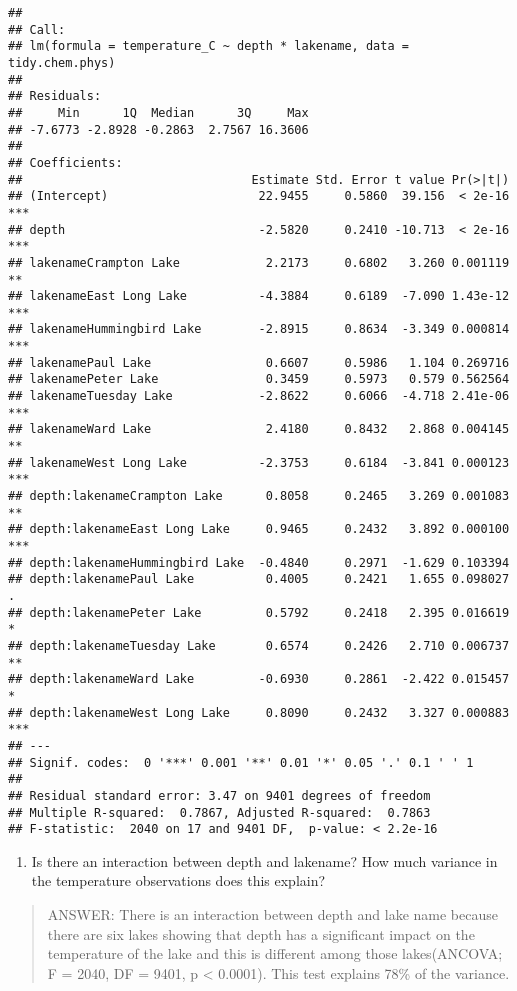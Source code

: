 \documentclass[]{article}
\providecommand{\tightlist}{%
  \setlength{\itemsep}{0pt}\setlength{\parskip}{0pt}}
\begin{document}
\begin{verbatim}
## 
## Call:
## lm(formula = temperature_C ~ depth * lakename, data = tidy.chem.phys)
## 
## Residuals:
##     Min      1Q  Median      3Q     Max 
## -7.6773 -2.8928 -0.2863  2.7567 16.3606 
## 
## Coefficients:
##                                Estimate Std. Error t value Pr(>|t|)    
## (Intercept)                     22.9455     0.5860  39.156  < 2e-16 ***
## depth                           -2.5820     0.2410 -10.713  < 2e-16 ***
## lakenameCrampton Lake            2.2173     0.6802   3.260 0.001119 ** 
## lakenameEast Long Lake          -4.3884     0.6189  -7.090 1.43e-12 ***
## lakenameHummingbird Lake        -2.8915     0.8634  -3.349 0.000814 ***
## lakenamePaul Lake                0.6607     0.5986   1.104 0.269716    
## lakenamePeter Lake               0.3459     0.5973   0.579 0.562564    
## lakenameTuesday Lake            -2.8622     0.6066  -4.718 2.41e-06 ***
## lakenameWard Lake                2.4180     0.8432   2.868 0.004145 ** 
## lakenameWest Long Lake          -2.3753     0.6184  -3.841 0.000123 ***
## depth:lakenameCrampton Lake      0.8058     0.2465   3.269 0.001083 ** 
## depth:lakenameEast Long Lake     0.9465     0.2432   3.892 0.000100 ***
## depth:lakenameHummingbird Lake  -0.4840     0.2971  -1.629 0.103394    
## depth:lakenamePaul Lake          0.4005     0.2421   1.655 0.098027 .  
## depth:lakenamePeter Lake         0.5792     0.2418   2.395 0.016619 *  
## depth:lakenameTuesday Lake       0.6574     0.2426   2.710 0.006737 ** 
## depth:lakenameWard Lake         -0.6930     0.2861  -2.422 0.015457 *  
## depth:lakenameWest Long Lake     0.8090     0.2432   3.327 0.000883 ***
## ---
## Signif. codes:  0 '***' 0.001 '**' 0.01 '*' 0.05 '.' 0.1 ' ' 1
## 
## Residual standard error: 3.47 on 9401 degrees of freedom
## Multiple R-squared:  0.7867, Adjusted R-squared:  0.7863 
## F-statistic:  2040 on 17 and 9401 DF,  p-value: < 2.2e-16
\end{verbatim}

\begin{enumerate}
\def\labelenumi{\arabic{enumi}.}
\setcounter{enumi}{14}
\tightlist
\item
  Is there an interaction between depth and lakename? How much variance
  in the temperature observations does this explain?
\end{enumerate}

\begin{quote}
ANSWER: There is an interaction between depth and lake name because
there are six lakes showing that depth has a significant impact on the
temperature of the lake and this is different among those lakes(ANCOVA;
F = 2040, DF = 9401, p \textless{} 0.0001). This test explains 78\% of
the variance.
\end{quote}
\end{document}
